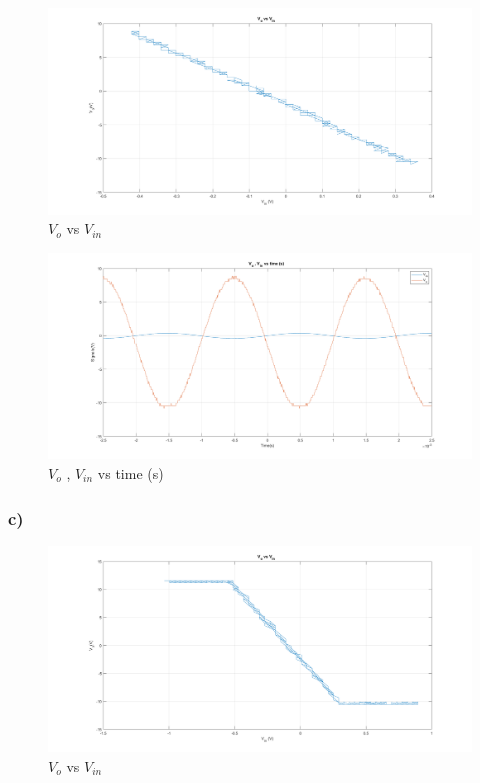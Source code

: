 \documentclass[letterpaper,12pt]{article}
\begin{document}
\begin{figure}[H]
	\centering
   \includegraphics[width=1\textwidth]{1b_1.png}
   \caption{\(V_{o}\) vs \(V_{in}\)}
\end{figure}

\begin{figure}[H]
	\centering
   \includegraphics[width=1\textwidth]{1b_2.png}
   \caption{\(V_{o}\) , \(V_{in}\) vs time (s) }
\end{figure}


\subsubsection{c)}


\begin{figure}[H]
	\centering
   \includegraphics[width=1\textwidth]{1c_1.png}
   \caption{\(V_{o}\) vs \(V_{in}\)}
\end{figure}
\end{document}

